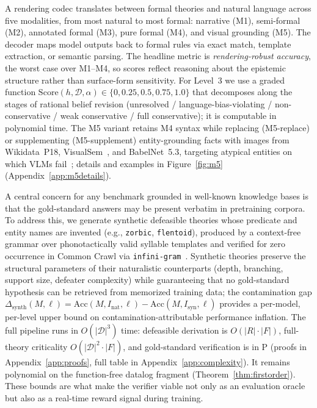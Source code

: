 \documentclass{article}
\theoremstyle{definition}
\newcommand{\D}{\mathcal{D}}
\newcommand{\Score}{\mathrm{Score}}
\begin{document}
A rendering codec translates between formal theories and natural language across five modalities, from most natural to most formal: narrative (M1), semi-formal (M2), annotated formal (M3), pure formal (M4), and visual grounding (M5). The decoder maps model outputs back to formal rules via exact match, template extraction, or semantic parsing. The headline metric is \emph{rendering-robust accuracy}, the worst case over M1--M4, so scores reflect reasoning about the epistemic structure rather than surface-form sensitivity. For Level~3 we use a graded function $\Score(h, \D, \alpha) \in \{0, 0.25, 0.5, 0.75, 1.0\}$ that decomposes along the stages of rational belief revision (unresolved / language-bias-violating / non-conservative / weak conservative / full conservative); it is computable in polynomial time. The M5 variant retains M4 syntax while replacing (M5-replace) or supplementing (M5-supplement) entity-grounding facts with images from Wikidata~P18, VisualSem~\citep{geigle2024babelimagenet}, and BabelNet~5.3, targeting atypical entities on which VLMs fail~\citep{park2025visage, chinchure2025blackswan}; details and examples in Figure~\ref{fig:m5} (Appendix~\ref{app:m5details}).

A central concern for any benchmark grounded in well-known knowledge bases is that the gold-standard answers may be present verbatim in pretraining corpora. To address this, we generate synthetic defeasible theories whose predicate and entity names are invented (e.g., \texttt{zorbic}, \texttt{flentoid}), produced by a context-free grammar over phonotactically valid syllable templates and verified for zero occurrence in Common Crawl via \texttt{infini-gram}~\citep{liu2024infini}. Synthetic theories preserve the structural parameters of their naturalistic counterparts (depth, branching, support size, defeater complexity) while guaranteeing that no gold-standard hypothesis can be retrieved from memorized training data; the contamination gap $\Delta_{\mathrm{synth}}(M, \ell) = \mathrm{Acc}(M, I_{\mathrm{nat}}, \ell) - \mathrm{Acc}(M, I_{\mathrm{syn}}, \ell)$ provides a per-model, per-level upper bound on contamination-attributable performance inflation. The full pipeline runs in $O(|\D|^3)$ time: defeasible derivation is $O(|R| \cdot |F|)$, full-theory criticality $O(|\D|^2 \cdot |F|)$, and gold-standard verification is in P (proofs in Appendix~\ref{app:proofs}, full table in Appendix~\ref{app:complexity}). It remains polynomial on the function-free datalog fragment (Theorem~\ref{thm:firstorder}). These bounds are what make the verifier viable not only as an evaluation oracle but also as a real-time reward signal during training.
\end{document}
